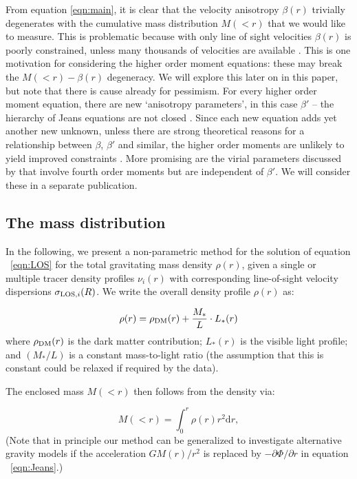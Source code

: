 From equation \ref{eqn:main}, it is clear that the velocity anisotropy
$\beta(r)$ trivially degenerates with the cumulative mass distribution $M(<r)$
that we would like to measure. This is problematic because with only line of
sight velocities $\beta(r)$ is poorly constrained, unless many thousands of
velocities are available \citep[e.g.][]{Wilkinson+2002}. This is one motivation
for considering the higher order moment equations: these may break the
$M(<r)-\beta(r)$ degeneracy. We will explore this later on in this paper, but
note that there is cause already for pessimism. For every higher order moment
equation, there are new `anisotropy parameters', in this case $\beta'$ -- the
hierarchy of Jeans equations are not closed
\citep[e.g.][]{BinneyTremaine2008}. Since each new equation adds yet another new
unknown, unless there are strong theoretical reasons for a relationship between
$\beta$, $\beta'$ and similar, the higher order moments are unlikely to yield
improved constraints \citep[e.g.][]{RichardsonFairbairn2013}. More promising are
the virial parameters discussed by \citep{RichardsonFairbairn2014} that involve
fourth order moments but are independent of $\beta'$. We will consider these in
a separate publication.

\subsection{The mass distribution}

In the following, we present a non-parametric method for the solution of
equation ~\ref{eqn:LOS} for the total gravitating mass
density $\rho(r)$, given a single or multiple tracer density profiles $\nu_i(r)$
with corresponding line-of-sight velocity dispersions $\sigma_{\text{LOS},i}(R)$. We write the overall density profile $\rho(r)$ as:

\begin{equation}
    \rho(r) = \rho_{\rm{DM}}(r)+ \frac{M_*}{L} \cdot L_*(r)
\end{equation}
where $\rho_{\rm{DM}}(r)$ is the dark matter contribution; $L_*(r)$ is the
visible light profile; and $(M_*/L)$ is a constant mass-to-light ratio (the
assumption that this is constant could be relaxed if required by the data).

The enclosed mass $M(<r)$ then follows from the density via:

\begin{equation}
    M(<r) = \int_0^r \rho(r) r^2 \text{d}r,
\end{equation}
(Note that in principle our method can be generalized to investigate
alternative gravity models if the acceleration $GM(r)/r^2$ is replaced
by $-\partial\Phi/\partial r$ in equation ~\ref{eqn:Jeans}.)

